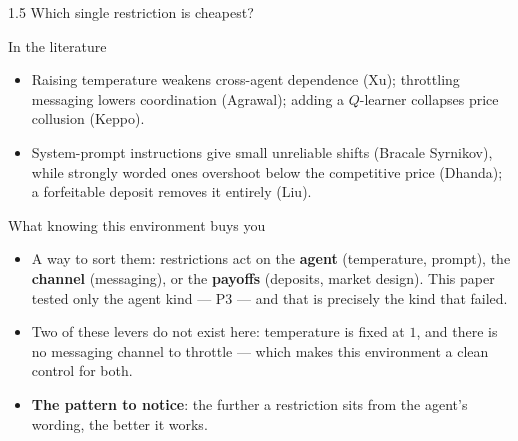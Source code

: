 \documentclass[aspectratio=169,9pt]{beamer}
\newcommand{\orange}[1]{\textcolor{AmazonOrange}{\textbf{#1}}}
\newcommand{\blue}[1]{\textcolor{densityblue}{\textbf{#1}}}
\begin{document}
\begin{frame}{1.5 Which single restriction is cheapest?}
\begin{block}{In the literature}
\begin{itemize}
    \item Raising temperature weakens cross-agent dependence (Xu); throttling messaging lowers coordination
    (Agrawal); adding a $Q$-learner collapses price collusion (Keppo).
    \item System-prompt instructions give small unreliable shifts (Bracale Syrnikov), while strongly worded
    ones overshoot below the competitive price (Dhanda); a forfeitable deposit removes it entirely (Liu).
\end{itemize}
\end{block}
\pause
\vspace{0.1cm}
\begin{block}{What knowing this environment buys you}
\begin{itemize}
    \item A way to sort them: restrictions act on the \orange{agent} (temperature, prompt), the
    \orange{channel} (messaging), or the \orange{payoffs} (deposits, market design). This paper tested only the
    agent kind --- P3 --- and that is precisely the kind that failed.
    \item Two of these levers do not exist here: temperature is fixed at $1$, and there is no messaging
    channel to throttle --- which makes this environment a clean control for both.
    \item \blue{The pattern to notice}: the further a restriction sits from the agent's wording, the better
    it works.
\end{itemize}
\end{block}
\end{frame}
\end{document}
